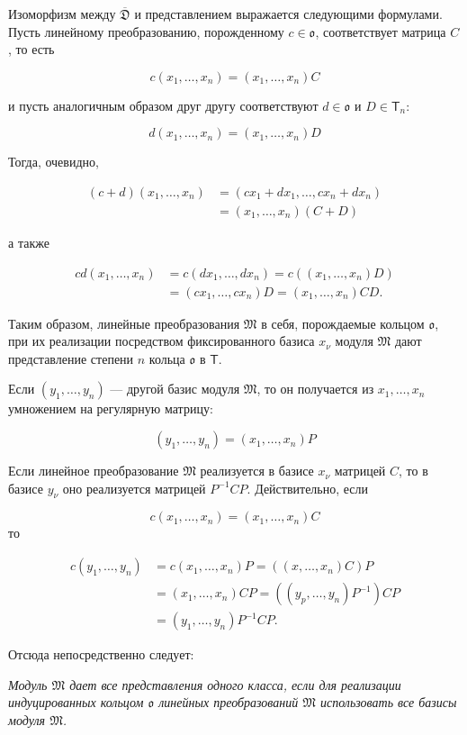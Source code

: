 \documentclass[11pt]{article}
\begin{document}
Изоморфизм между \(\overline{\mathfrak D}\) и представлением выражается следующими формулами. Пусть линейному преобразованию, порожденному \(c\in\mathfrak{o}\), соответствует матрица \(C\), то есть

\[
c(x_1,\ldots,x_n)=(x_1,\ldots,x_n)C
\]

и пусть аналогичным образом друг другу соответствуют \(d\in\mathfrak{o}\) и \(D\in\mathsf T_n\):

\[
d(x_1,\ldots,x_n)=(x_1,\ldots,x_n)D
\]

Тогда, очевидно,

\[
\begin{aligned}
(c+d)(x_1,\ldots,x_n)
&=(cx_1+dx_1,\ldots,cx_n+dx_n)\\
&=(x_1,\ldots,x_n)(C+D)
\end{aligned}
\]

а также

\[
\begin{aligned}
cd(x_1,\ldots,x_n)
&=c(dx_1,\ldots,dx_n)=c((x_1,\ldots,x_n)D)\\
&=(cx_1,\ldots,cx_n)D=(x_1,\ldots,x_n)CD.
\end{aligned}
\]

Таким образом, линейные преобразования \(\mathfrak M\) в себя, порождаемые кольцом \(\mathfrak{o}\), при их реализации посредством фиксированного базиса \(x_\nu\) модуля \(\mathfrak M\) дают представление степени \(n\) кольца \(\mathfrak{o}\) в \(\mathsf T\).

Если \((y_1,\ldots,y_n)\) --- другой базис модуля \(\mathfrak M\), то он получается из \(x_1,\ldots,x_n\) умножением на регулярную матрицу:

\[(y_1,\ldots,y_n)=(x_1,\ldots,x_n)P\]

Если линейное преобразование \(\mathfrak M\) реализуется в базисе \(x_\nu\) матрицей \(C\), то в базисе \(y_\nu\) оно реализуется матрицей \(P^{-1}CP\). Действительно, если

\[c(x_1,\ldots,x_n)=(x_1,\ldots,x_n)C\]
то

\[
\begin{aligned}
c(y_1,\ldots,y_n)
&=c(x_1,\ldots,x_n)P=((x,\ldots,x_n)C)P\\
&=(x_1,\ldots,x_n)CP=((y_p,\ldots,y_n)P^{-1})CP\\
&=(y_1,\ldots,y_n)P^{-1}CP.
\end{aligned}
\]

Отсюда непосредственно следует:

\emph{Модуль \(\mathfrak M\) дает все представления одного класса, если для реализации индуцированных кольцом \(\mathfrak{o}\) линейных преобразований \(\mathfrak M\) использовать все базисы модуля \(\mathfrak M\).}
\end{document}
